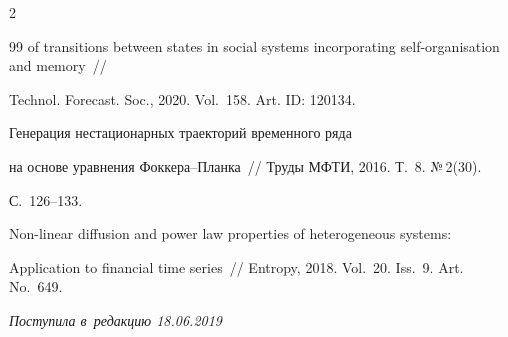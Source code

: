 \begin{multicols}{2}
{{\begin{thebibliography}{99}
of transitions between states in social systems incorporating self-organisation and memory~// 


Technol. Forecast. Soc., 2020. Vol.~158. Art. ID: 120134.




 Генерация нестационарных траекторий временного ряда 


на основе уравнения Фок\-ке\-ра--План\-ка~// Труды МФТИ, 2016. Т.~8. №\,2(30).  


С.~126--133.




 Non-linear diffusion and power law properties of heterogeneous systems: 


Application to financial time series~// Entropy, 2018. Vol.~20. Iss.~9. Art. No.~649.


\end{thebibliography}





}


}





\end{multicols}





\vspace*{-10pt}





\hfill{\small\textit{Поступила в~редакцию 18.06.2019}}















\newpage





\vspace*{-28pt}















